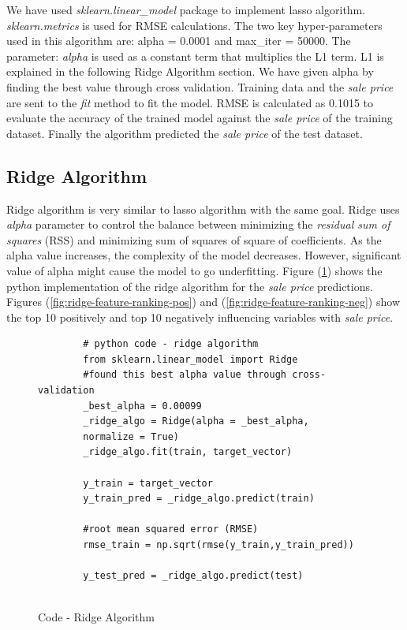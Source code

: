 \documentclass[sigconf]{acmart}
\begin{document}
	We have used {\em sklearn.linear\_model} package to implement lasso algorithm. {\em sklearn.metrics} is used for RMSE calculations. The two key hyper-parameters used in this algorithm are: alpha = 0.0001 and max\_iter = 50000. The parameter: {\em alpha} is used as a constant term that multiplies the L1 term. L1 is explained in the following Ridge Algorithm section. We have given alpha by finding the best value through cross validation. Training data and the {\em sale price} are sent to the {\em fit} method to fit the model. RMSE is calculated as 0.1015 to evaluate the accuracy of the trained model against the {\em sale price} of the training dataset. Finally the algorithm predicted the {\em sale price} of the test dataset.
	
	\subsection{Ridge Algorithm}
		
	Ridge algorithm is very similar to lasso algorithm with the same goal. Ridge uses {\em alpha} parameter to control the balance between minimizing the {\em residual sum of squares} (RSS) and minimizing sum of squares of square of coefficients. As the alpha value increases, the complexity of the model decreases. However, significant value of alpha might cause the model to go underfitting. Figure (\ref{c:ridge}) shows the python implementation of the ridge algorithm for the {\em sale price} predictions. Figures ({\ref{fig:ridge-feature-ranking-pos}}) and (\ref{fig:ridge-feature-ranking-neg}) show the top 10 positively and top 10 negatively influencing variables with {\em sale price}.
	
	\begin{figure}[htb]
		\begin{verbatim}
		# python code - ridge algorithm
		from sklearn.linear_model import Ridge
		#found this best alpha value through cross-validation
		_best_alpha = 0.00099	
		_ridge_algo = Ridge(alpha = _best_alpha, 
		normalize = True)	               	
		_ridge_algo.fit(train, target_vector)
		
		y_train = target_vector
		y_train_pred = _ridge_algo.predict(train)
		
		#root mean squared error (RMSE)
		rmse_train = np.sqrt(rmse(y_train,y_train_pred))	
		
		y_test_pred = _ridge_algo.predict(test)	
		
		\end{verbatim}
		\caption{Code - Ridge Algorithm} \label{c:ridge} 
	\end{figure}
	
\end{document}
